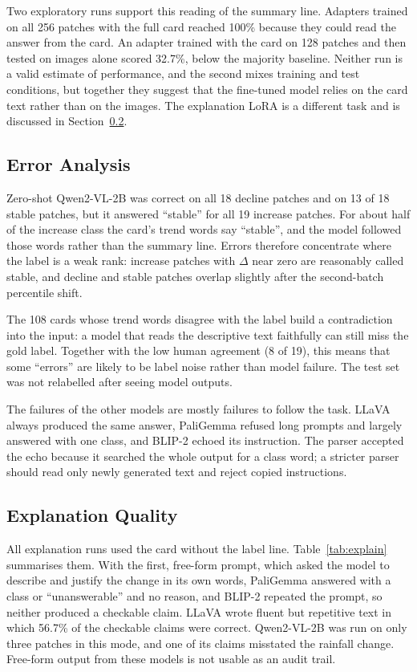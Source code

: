 \documentclass[11pt]{article}
\begin{document}
Two exploratory runs support this reading of the summary line. Adapters
trained on all 256 patches with the full card reached 100\% because
they could read the answer from the card. An adapter trained with the
card on 128 patches and then tested on images alone scored 32.7\%,
below the majority baseline. Neither run is a valid estimate of
performance, and the second mixes training and test conditions, but
together they suggest that the fine-tuned model relies on the card text
rather than on the images. The explanation LoRA is a
different task and is discussed in Section~\ref{sec:expl}.

\subsection{Error Analysis}

Zero-shot Qwen2-VL-2B was correct on all 18 decline patches and on 13 of
18 stable patches, but it answered ``stable'' for all 19 increase
patches. For about half of the increase class the card's trend words
say ``stable'', and the model followed those words rather than the
summary line. Errors therefore concentrate where the label is a weak
rank: increase patches with $\Delta$ near zero are reasonably called
stable, and decline and stable patches overlap slightly after the
second-batch percentile shift.

The 108 cards whose trend words disagree with the label build a
contradiction into the input: a model that reads the descriptive text
faithfully can still miss the gold label. Together with the low human
agreement (8 of 19), this means that some ``errors'' are likely to be
label noise rather than model failure. The test set was not relabelled
after seeing model outputs.

The failures of the other models are mostly failures to follow the task.
LLaVA always produced the same answer, PaliGemma refused long prompts
and largely answered with one class, and BLIP-2 echoed its instruction.
The parser accepted the echo because it searched the whole output for a
class word; a stricter parser should read only newly generated text and
reject copied instructions.

\subsection{Explanation Quality}
\label{sec:expl}

All explanation runs used the card without the label line.
Table~\ref{tab:explain} summarises them. With the first, free-form
prompt, which asked the model to describe and justify the change in its
own words, PaliGemma answered with a class or ``unanswerable'' and no
reason, and BLIP-2 repeated the prompt, so neither produced a checkable
claim. LLaVA wrote fluent but repetitive text in which 56.7\% of the
checkable claims were correct. Qwen2-VL-2B was run on only three
patches in this mode, and one of its claims misstated the rainfall
change. Free-form output from these models is not usable as an audit
trail.
\end{document}

